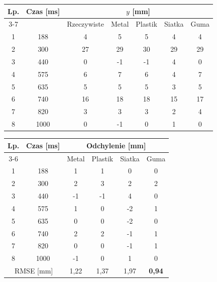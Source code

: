 \begin{tabular}{cc c cccc}
\toprule
Lp. & Czas [ms] & \multicolumn{5}{c}{$y$ [mm]} \\
\cmidrule(lr){3-7}
 &  & Rzeczywiste & Metal & Plastik & Siatka & Guma \\
\midrule
1 & 188 & 4 & 5 & 5 & 4 & 4 \\
2 & 300 & 27 & 29 & 30 & 29 & 29 \\
3 & 440 & 0 & -1 & -1 & 4 & 0 \\
4 & 575 & 6 & 7 & 6 & 4 & 7 \\
5 & 635 & 5 & 5 & 5 & 3 & 5 \\
6 & 740 & 16 & 18 & 18 & 15 & 17 \\
7 & 820 & 3 & 3 & 3 & 2 & 4 \\
8 & 1000 & 0 & -1 & 0 & 1 & 0 \\
\bottomrule
\end{tabular}

\bigskip

\begin{tabular}{cc cccc}
\toprule
Lp. & Czas [ms] & \multicolumn{4}{c}{Odchylenie [mm]} \\
\cmidrule(lr){3-6}
 &  & Metal & Plastik & Siatka & Guma \\
\midrule
1 & 188 & 1 & 1 & 0 & 0 \\
2 & 300 & 2 & 3 & 2 & 2 \\
3 & 440 & -1 & -1 & 4 & 0 \\
4 & 575 & 1 & 0 & -2 & 1 \\
5 & 635 & 0 & 0 & -2 & 0 \\
6 & 740 & 2 & 2 & -1 & 1 \\
7 & 820 & 0 & 0 & -1 & 1 \\
8 & 1000 & -1 & 0 & 1 & 0 \\
\midrule
\multicolumn{2}{c}{RMSE [mm]} & 1,22 & 1,37 & 1,97 & \textbf{0,94} \\
\bottomrule
\end{tabular}
